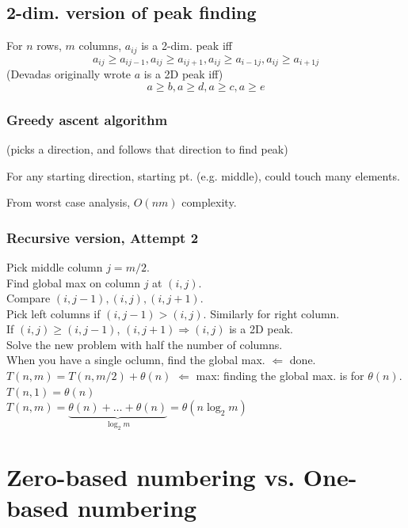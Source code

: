 \documentclass[10pt]{amsart}
\begin{document}
\subsection{2-dim. version of peak finding}

For $n$ rows, $m$ columns, $a_{ij}$ is a 2-dim. peak iff 
\[
a_{ij} \geq a_{ij-1}, a_{ij} \geq a_{ij+1}, a_{ij} \geq a_{i-1j}, a_{ij} \geq a_{i+1j}
\]
(Devadas originally wrote $a$ is a 2D peak iff)
\[
a \geq b, a \geq d, a\geq c, a\geq e
\]


\subsubsection{Greedy ascent algorithm} (picks a direction, and follows that direction to find peak)

For any starting direction, starting pt. (e.g. middle), could touch many elements. 

From worst case analysis, $O(nm)$ complexity.

\subsubsection{Recursive version, Attempt 2}

Pick middle column $j =m/2$. \\
Find global max on column $j$ at $(i, j)$. \\
Compare $(i, j -1), (i, j), (i, j +1)$. \\
Pick left columns if $(i,j-1) > (i,j)$. Similarly for right column. \\

If $(i,j) \geq (i,j-1)$, $(i, j+1) \Longrightarrow (i,j)$ is a 2D peak. \\
Solve the new problem with half the number of columns. \\
When you have a single oclumn, find the global max. $\Longleftarrow$ done. \\

$T(n,m) = T(n,m/2) + \theta(n)$ $\Longleftarrow $ max: finding the global max. is for $\theta(n)$. \\
$T(n, 1) = \theta(n)$ \\
$T(n, m)  = \underbrace{\theta(n) + \dots + \theta(n)}_{\log_2{m} } = \theta(n\log_2{m})$ \\

\section{Zero-based numbering vs. One-based numbering}
\end{document}
